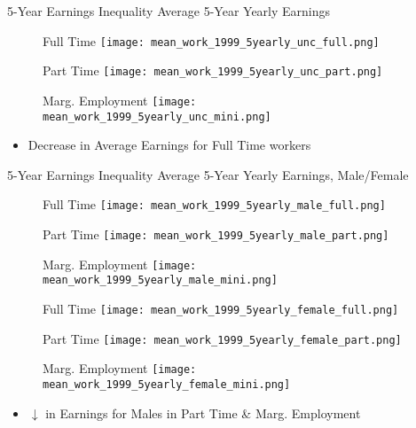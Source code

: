 \documentclass[hyperref={bookmarks=false}]{beamer}
\begin{document}
\begin{appendix}
\begin{frame}{5-Year Earnings Inequality}
Average 5-Year Yearly Earnings
\begin{figure}[!t]
\begin{minipage}[b]{0.32\textwidth}{Full Time}
\centering
\texttt{[image: mean\_work\_1999\_5yearly\_unc\_full.png]}
\end{minipage}
\begin{minipage}[b]{0.32\textwidth}{Part Time}
\centering
\texttt{[image: mean\_work\_1999\_5yearly\_unc\_part.png]}
\end{minipage}
\begin{minipage}[b]{0.32\textwidth}{Marg. Employment}
\centering
\texttt{[image: mean\_work\_1999\_5yearly\_unc\_mini.png]}
\end{minipage}
\end{figure}
\begin{itemize}
\item Decrease in Average Earnings for Full Time workers
\end{itemize}
\end{frame}

\begin{frame}{5-Year Earnings Inequality}
Average 5-Year Yearly Earnings, Male/Female
\begin{figure}[!t]
\begin{minipage}[b]{0.32\textwidth}{Full Time}
\centering
\texttt{[image: mean\_work\_1999\_5yearly\_male\_full.png]}
\end{minipage}
\begin{minipage}[b]{0.32\textwidth}{Part Time}
\centering
\texttt{[image: mean\_work\_1999\_5yearly\_male\_part.png]}
\end{minipage}
\begin{minipage}[b]{0.32\textwidth}{Marg. Employment}
\centering
\texttt{[image: mean\_work\_1999\_5yearly\_male\_mini.png]}
\end{minipage}
\begin{minipage}[b]{0.32\textwidth}{Full Time}
\centering
\texttt{[image: mean\_work\_1999\_5yearly\_female\_full.png]}
\end{minipage}
\begin{minipage}[b]{0.32\textwidth}{Part Time}
\centering
\texttt{[image: mean\_work\_1999\_5yearly\_female\_part.png]}
\end{minipage}
\begin{minipage}[b]{0.32\textwidth}{Marg. Employment}
\centering
\texttt{[image: mean\_work\_1999\_5yearly\_female\_mini.png]}
\end{minipage}
\end{figure}
\begin{itemize}
\item $\downarrow$ in Earnings for Males in Part Time \& Marg. Employment 
\end{itemize}
\end{frame}


\end{appendix}
\end{document}
